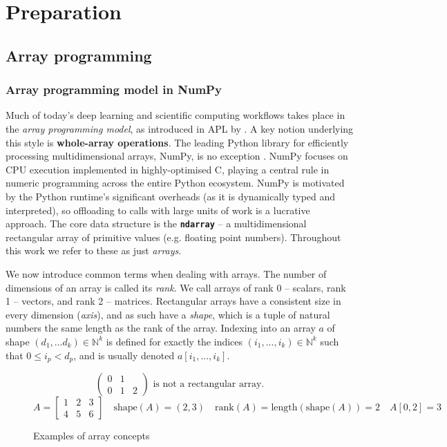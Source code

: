 \chapter{Preparation}

\section{Array programming}

\subsection{Array programming model in NumPy}

Much of today's deep learning and scientific computing workflows takes place in the \textit{array programming model}, as introduced in APL by \textcite{iverson1962programming}. A key notion underlying this style is \textbf{whole-array operations}. The leading Python library for efficiently processing multidimensional arrays, NumPy, is no exception \cite{harris2020array}. NumPy focuses on CPU execution implemented in highly-optimised C, playing a central rule in numeric programming across the entire Python ecosystem. NumPy is motivated by the Python runtime's significant overheads (as it is dynamically typed and interpreted), so offloading to calls with large units of work is a lucrative approach. The core data structure is the \texttt{\textbf{ndarray}} -- a multidimensional rectangular array of primitive values (e.g. floating point numbers). Throughout this work we refer to these as just \textit{arrays}. 

We now introduce common terms when dealing with arrays. The number of dimensions of an array is called its \textit{rank}. We call arrays of rank 0  -- scalars, rank 1 -- vectors, and rank 2 -- matrices. Rectangular arrays have a consistent size in every dimension (\textit{axis}), and as such have a \textit{shape}, which is a tuple of natural numbers the same length as the rank of the array. Indexing into an array $a$ of shape $(d_1, ... d_k) \in \mathbb{N}^k$ is defined for exactly the indices $(i_1, ..., i_k) \in \mathbb{N}^k$ such that $0 \le i_p < d_p$, and is usually denoted $a[i_1, ..., i_k]$.
\begin{figure}[h]
    \centering
    $$ \begin{pmatrix}
    0 & 1 & \\
    0 & 1 & 2
    \end{pmatrix} \text{ is not a rectangular array.} $$
    $$ A = \begin{bmatrix}
        1 & 2 & 3 \\ 
        4 & 5 & 6
    \end{bmatrix} \quad \mathrm{shape}(A) = (2, 3)  \quad \mathrm{rank}(A) = \mathrm{length}\left(\mathrm{shape}(A)\right) = 2 \quad A[0, 2] = 3 $$
    \caption{Examples of array concepts}
    \label{fig:array-examples}
\end{figure}

